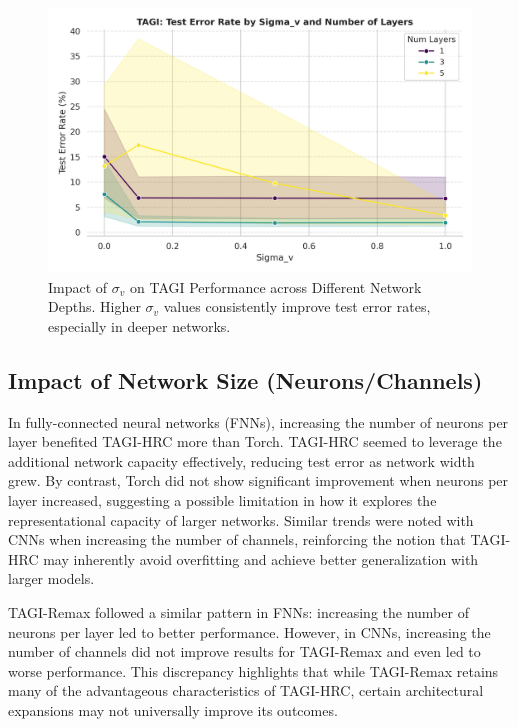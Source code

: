 \documentclass{article}
\begin{document}
\begin{figure}[h]
\centering
\includegraphics[width=1.0\linewidth]{Figures/tagi_sigma_comparison.png}
\caption{Impact of $\sigma_v$ on TAGI Performance across Different Network Depths. Higher $\sigma_v$ values consistently improve test error rates, especially in deeper networks.}
\label{fig:tagi_sigma}
\end{figure}

\subsection{Impact of Network Size (Neurons/Channels)}
In fully-connected neural networks (FNNs), increasing the number of neurons per layer benefited TAGI-HRC more than Torch. TAGI-HRC seemed to leverage the additional network capacity effectively, reducing test error as network width grew. By contrast, Torch did not show significant improvement when neurons per layer increased, suggesting a possible limitation in how it explores the representational capacity of larger networks. Similar trends were noted with CNNs when increasing the number of channels, reinforcing the notion that TAGI-HRC may inherently avoid overfitting and achieve better generalization with larger models.

TAGI-Remax followed a similar pattern in FNNs: increasing the number of neurons per layer led to better performance. However, in CNNs, increasing the number of channels did not improve results for TAGI-Remax and even led to worse performance. This discrepancy highlights that while TAGI-Remax retains many of the advantageous characteristics of TAGI-HRC, certain architectural expansions may not universally improve its outcomes.
\end{document}
